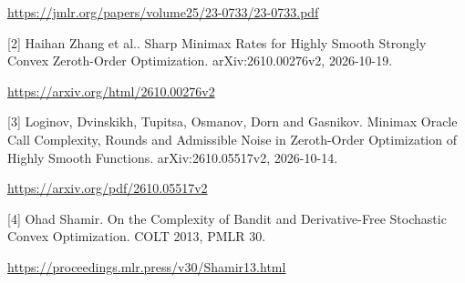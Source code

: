 \documentclass[10pt,a4paper]{article}
\begin{document}
\url{https://jmlr.org/papers/volume25/23-0733/23-0733.pdf}

[2] Haihan Zhang et al.. Sharp Minimax Rates for Highly Smooth Strongly Convex Zeroth-Order Optimization. arXiv:2610.00276v2, 2026-10-19.

\url{https://arxiv.org/html/2610.00276v2}

[3] Loginov, Dvinskikh, Tupitsa, Osmanov, Dorn and Gasnikov. Minimax Oracle Call Complexity, Rounds and Admissible Noise in Zeroth-Order Optimization of Highly Smooth Functions. arXiv:2610.05517v2, 2026-10-14.

\url{https://arxiv.org/pdf/2610.05517v2}

[4] Ohad Shamir. On the Complexity of Bandit and Derivative-Free Stochastic Convex Optimization. COLT 2013, PMLR 30.

\url{https://proceedings.mlr.press/v30/Shamir13.html}
\end{document}
